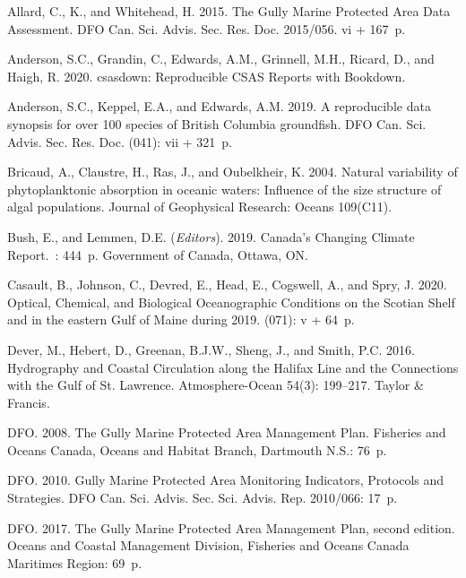 \documentclass[12pt]{article}\usepackage[]{graphicx}\usepackage[]{color}
\begin{document}
\hypertarget{refs}{}
\begin{CSLReferences}{1}{0}
%
Allard, C., K., and Whitehead, H. 2015. {The Gully Marine Protected Area Data Assessment}. DFO Can. Sci. Advis. Sec. Res. Doc. 2015/056. vi + 167~p.

%
Anderson, S.C., Grandin, C., Edwards, A.M., Grinnell, M.H., Ricard, D., and Haigh, R. 2020. {csasdown: Reproducible CSAS Reports with Bookdown}.

%
Anderson, S.C., Keppel, E.A., and Edwards, A.M. 2019. {A reproducible data synopsis for over 100 species of British Columbia groundfish}. DFO Can. Sci. Advis. Sec. Res. Doc. (041): vii + 321~p.

%
Bricaud, A., Claustre, H., Ras, J., and Oubelkheir, K. 2004. {Natural variability of phytoplanktonic absorption in oceanic waters: Influence of the size structure of algal populations}. Journal of Geophysical Research: Oceans 109(C11).

%
Bush, E., and Lemmen, D.E. (\emph{Editors}). 2019. Canada's {Changing} {Climate} {Report}.~: 444~p. Government of Canada, Ottawa, ON.

%
Casault, B., Johnson, C., Devred, E., Head, E., Cogswell, A., and Spry, J. 2020. Optical, {Chemical}, and {Biological} {Oceanographic} {Conditions} on the {Scotian} {Shelf} and in the eastern {Gulf} of {Maine} during 2019. (071): v + 64~p.

%
Dever, M., Hebert, D., Greenan, B.J.W., Sheng, J., and Smith, P.C. 2016. {Hydrography and Coastal Circulation along the Halifax Line and the Connections with the Gulf of St. Lawrence}. Atmosphere-Ocean 54(3): 199--217. Taylor \& Francis.

%
DFO. 2008. {The Gully Marine Protected Area Management Plan}. Fisheries and Oceans Canada, Oceans and Habitat Branch, Dartmouth N.S.: 76~p.

%
DFO. 2010. {Gully Marine Protected Area Monitoring Indicators, Protocols and Strategies}. DFO Can. Sci. Advis. Sec. Sci. Advis. Rep. 2010/066: 17~p.

%
DFO. 2017. The {Gully} {Marine} {Protected} {Area} {Management} {Plan}, second edition. Oceans and Coastal Management Division, Fisheries and Oceans Canada Maritimes Region: 69~p.


\end{CSLReferences}
\end{document}
